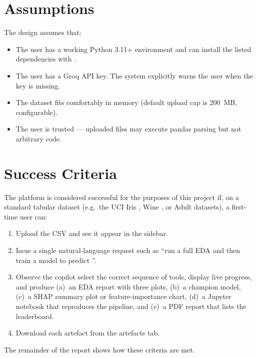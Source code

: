 \section{Assumptions}
\label{sec:assumptions}

The design assumes that:

\begin{itemize}[leftmargin=1.4em]
  \item The user has a working Python 3.11+ environment and can
        install the listed dependencies with .
  \item The user has a Groq API key. The system explicitly warns
        the user when the key is missing.
  \item The dataset fits comfortably in memory (default upload cap
        is 200~MB, configurable).
  \item The user is trusted --- uploaded files may execute pandas
        parsing but not arbitrary code.
\end{itemize}

\section{Success Criteria}
\label{sec:success}

The platform is considered successful for the purposes of this project
if, on a standard tabular dataset (e.g.\ the UCI Iris
\citep{uciiris}, Wine \citep{uciwine}, or Adult \citep{uciadult}
datasets), a first-time user can:

\begin{enumerate}[leftmargin=1.4em]
  \item Upload the CSV and see it appear in the sidebar.
  \item Issue a single natural-language request such as ``run a full
        EDA and then train a model to predict ''.
  \item Observe the copilot select the correct sequence of tools,
        display live progress, and produce (a)~an EDA report with
        three plots, (b)~a champion model, (c)~a SHAP summary plot
        or feature-importance chart, (d)~a Jupyter notebook that
        reproduces the pipeline, and (e)~a PDF report that lists the
        leaderboard.
  \item Download each artefact from the artefacts tab.
\end{enumerate}

The remainder of the report shows how these criteria are met.
